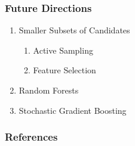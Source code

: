 \documentclass[10pt]{beamer}
\begin{document}
\begin{frame}
	\frametitle{Future Directions}

	\begin{enumerate}
		\item Smaller Subsets of Candidates
			\begin{enumerate}
				\item Active Sampling
				\item Feature Selection
			\end{enumerate}

		\item Random Forests \citep{rndfrst}
		\item Stochastic Gradient Boosting \citep{sgboost}
	\end{enumerate}

\end{frame}

\begin{frame}
	\frametitle{References}
  

\end{frame}
\end{document}
